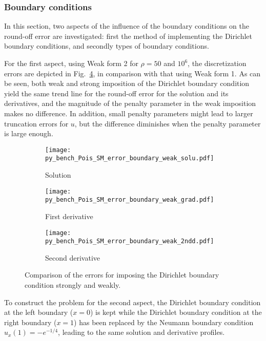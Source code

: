 \documentclass[review,3p]{elsarticle}
\begin{document}
\subsubsection{Boundary conditions}	\label{section_BC}

In this section, two aspects of the influence of the boundary conditions on the round-off error are investigated: first the method of implementing the Dirichlet boundary conditions, and secondly types of boundary conditions. 

For the first aspect, using Weak form 2 for $\rho=50$ and $10^6$, the discretization errors are depicted in Fig.~\ref{py_bench_Pois_SM_error_boundary_weak}, in comparison with that using Weak form 1. As can be seen, both weak and strong imposition of the Dirichlet boundary condition yield the same trend line for the round-off error for the solution and its derivatives, and the magnitude of the penalty parameter in the weak imposition makes no difference. In addition, small penalty parameters might lead to larger truncation errors for $u$, but the difference diminishes when the penalty parameter is large enough.

\begin{figure}[!ht]
    \begin{subfigure}{5.5cm}
        \texttt{[image: py\_bench\_Pois\_SM\_error\_boundary\_weak\_solu.pdf]}
        \caption{Solution}
        \label{py_bench_Pois_SM_error_boundary_weak_solu}
    \end{subfigure}
    \hspace{-0.2cm}
    \begin{subfigure}{5.5cm}
        \texttt{[image: py\_bench\_Pois\_SM\_error\_boundary\_weak\_grad.pdf]}
        \caption{First derivative}
        \label{py_bench_Pois_SM_error_boundary_weak_grad}
    \end{subfigure}
    \hspace{-0.2cm}
    \begin{subfigure}{5.5cm}
        \texttt{[image: py\_bench\_Pois\_SM\_error\_boundary\_weak\_2ndd.pdf]}
        \caption{Second derivative}
        \label{py_bench_Pois_SM_error_boundary_weak_2ndd}
    \end{subfigure}
\caption{Comparison of the errors for imposing the Dirichlet boundary condition strongly and weakly.}
\label{py_bench_Pois_SM_error_boundary_weak}
\end{figure}

To construct the problem for the second aspect, the Dirichlet boundary condition at the left boundary ($x=0$) is kept while the Dirichlet boundary condition at the right boundary ($x=1$) has been replaced by the Neumann boundary condition $u_x (1) = -e^{-1/4}$, leading to the same solution and derivative profiles. 
\end{document}
